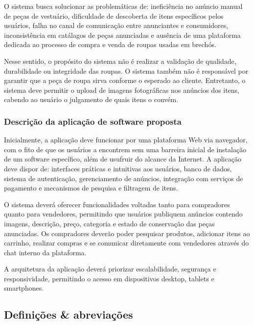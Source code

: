 ﻿\documentclass[12pt,a4paper]{article}
\begin{document}
O sistema busca solucionar as problemáticas de: ineficiência no anúncio manual de peças de vestuário, dificuldade de descoberta de itens específicos pelos usuários, falha no canal de comunicação entre anunciantes e consumidores, inconsistência em catálagos de peças anunciadas e ausência de uma plataforma dedicada ao processo de compra e venda de roupas usadas em brechós.

Nesse sentido, o propósito do sistema não é realizar a validação de qualidade, durabilidade ou integridade das roupas. O sistema também não é responsável por garantir que a peça de roupa sirva conforme o esperado ao cliente. Entretanto, o sistema deve permitir o upload de imagens fotográficas nos anúncios dos itens, cabendo ao usuário o julgamento de quais itens o convém.

\subsubsection{Descrição da aplicação de software proposta}
\label{sec:DescricaoAplicacao}

Inicialmente, a aplicação deve funcionar por uma plataforma Web via navegador, com o fito de que os usuários a encontrem sem uma barreira inicial de instalação de um software específico, além de usufruir do alcance da Internet. A aplicação deve dispor de: interfaces práticas e intuitivas aos usuários, banco de dados, sistema de autenticação, gerenciamento de anúncios, integração com serviços de pagamento e mecanismos de pesquisa e filtragem de itens.

O sistema deverá oferecer funcionalidades voltadas tanto para compradores quanto para vendedores, permitindo que usuários publiquem anúncios contendo imagens, descrição, preço, categoria e estado de conservação das peças anunciadas. Os compradores deverão poder pesquisar produtos, adicionar itens ao carrinho, realizar compras e se comunicar diretamente com vendedores através do chat interno da plataforma.

A arquitetura da aplicação deverá priorizar escalabilidade, segurança e responsividade, permitindo o acesso em dispositivos desktop, tablets e smartphones.

\subsection{Definições \& abreviações}
\label{sec:Definicoes}
\end{document}
